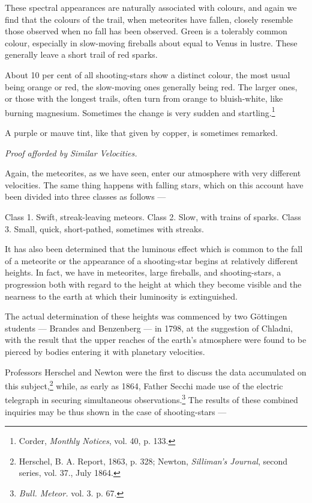\documentclass[a4paper, 12pt, oneside, polutonikogreek, english]{article}
\begin{document}
These spectral appearances are naturally associated with colours, and again we find that the colours of the trail, when meteorites have fallen, closely resemble those observed when no fall has been observed. Green is a tolerably common colour, especially in slow-moving fireballs about equal to Venus in lustre. These generally leave a short trail of red sparks.

About 10 per cent of all shooting-stars show a distinct colour, the most usual being orange or red, the slow-moving ones generally being red. The larger ones, or those with the longest trails, often turn from orange to bluish-white, like burning magnesium. Sometimes the change is very sudden and startling.\footnote{Corder, \emph{Monthly Notices}, vol. 40, p. 133.}

A purple or mauve tint, like that given by copper, is sometimes remarked.

\emph{Proof afforded by Similar Velocities.}

Again, the meteorites, as we have seen, enter our atmosphere with very different velocities. The same thing happens with falling stars, which on this account have been divided into three classes as follows ---

Class 1. Swift, streak-leaving meteors. 
Class 2. Slow, with trains of sparks. 
Class 3. Small, quick, short-pathed, sometimes with streaks.

It has also been determined that the luminous effect which is common to the fall of a meteorite or the appearance of a shooting-star begins at relatively different heights. In fact, we have in meteorites, large fireballs, and shooting-stars, a progression both with regard to the height at which they become visible and the nearness to the earth at which their luminosity is extinguished.

The actual determination of these heights was commenced by two Göttingen students --- Brandes and Benzenberg --- in 1798, at the suggestion of Chladni, with the result that the upper reaches of the earth's atmosphere were found to be pierced by bodies entering it with planetary velocities.

Professors Herschel and Newton were the first to discuss the data accumulated on this subject,\footnote{Herschel, B. A. Report, 1863, p. 328; Newton, \emph{Silliman's Journal}, second series, vol. 37., July 1864.} while, as early as 1864, Father Secchi made use of the electric telegraph in securing simultaneous observations.\footnote{\emph{Bull. Meteor.} vol. 3. p. 67.} The results of these combined inquiries may be thus shown in the case of shooting-stars ---
\end{document}
